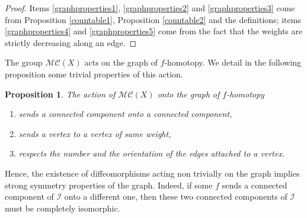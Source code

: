 \documentclass[10pt]{amsart}
\let\mathcal\mathscr
\theoremstyle{plain}
\newtheorem{proposition}[theorem]{Proposition}
\theoremstyle{definition}
\theoremstyle{remark}
\numberwithin{equation}{section}
\newcommand{\cI}{\mathcal{I}}
\begin{document}
\begin{proof}
Items \eqref{graphproperties1}, \eqref{graphproperties2} and \eqref{graphproperties3} come
from Proposition \ref{countable1}, Proposition \ref{countable2} and the definitions; items \eqref{graphproperties4} and \eqref{graphproperties5} come from the fact that the weights are strictly decreasing along an edge.
\end{proof}

The group $\mathcal M\mathcal C(X)$ acts on the graph of $f$-homotopy. We detail in the following proposition some trivial properties of this action.

\begin{proposition}
\label{graphaction}
The action of $\mathcal M\mathcal C(X)$ onto the graph of $f$-homotopy
\begin{enumerate}
\item
sends a connected component onto a connected component,
\item
sends a vertex to a vertex of same weight,
\item
respects the number and the orientation of the edges attached to a vertex.
\end{enumerate}
\end{proposition}

Hence, the existence of diffeomorphisms acting non trivially on the graph implies strong symmetry properties of the graph. Indeed, if some $f$ sends a connected component of $\cI$ onto a different one, then these two connected components of $\cI$ must be completely isomorphic.
\end{document}
